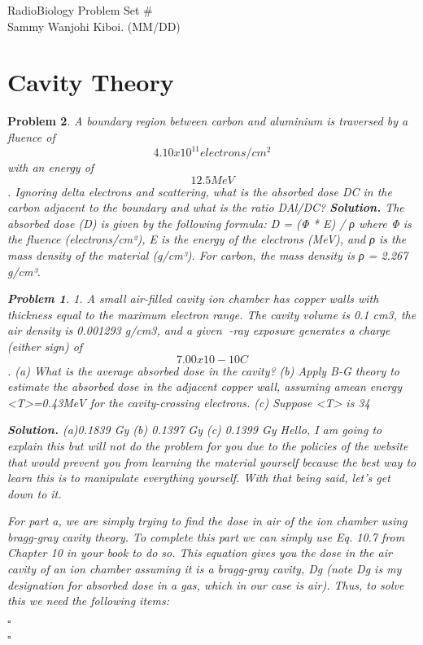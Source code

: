\documentclass[12pt]{article}
\newtheorem{problem}{Problem}
\newenvironment{solution}[1][\it{Solution}]{\textbf{#1. } }{$\square$}
\begin{document}
\noindent RadioBiology \hfill Problem Set \#\\
Sammy Wanjohi Kiboi. (MM/DD)

\hrulefill

\section{Cavity Theory}
\begin{problem}
A boundary region between carbon and aluminium is traversed by a fluence of \begin{equation}4.10x10^11 electrons/cm^2 \end{equation} with an energy of \begin{equation}12.5 MeV\end{equation}. Ignoring delta electrons and scattering, what is the absorbed dose DC in the carbon adjacent to the boundary and what is the ratio DAl/DC?
\begin{solution}
The absorbed dose (D) is given by the following formula: D = (Φ * E) / ρ where Φ is the fluence (electrons/cm²), E is the energy of the electrons (MeV), and ρ is the mass density of the material (g/cm³). For carbon, the mass density is ρ = 2.267 g/cm³.

\newline
\begin{problem}
1. A small air-filled cavity ion chamber has copper walls with thickness equal to the maximum electron range. The cavity volume is 0.1 cm3, the air density is 0.001293 g/cm3, and a given -ray exposure generates a charge (either sign) of \begin{equation}7.00x10-10 C\end{equation}.
(a) What is the average absorbed dose in the cavity?
(b) Apply B-G theory to estimate the absorbed dose in the adjacent copper wall, assuming amean energy <T>=0.43MeV for the cavity-crossing electrons.
(c) Suppose <T> is 34%

\begin{solution}
(a)0.1839 Gy
(b) 0.1397 Gy
(c) 0.1399 Gy
Hello, I am going to explain this but will not do the problem for you due to the policies of the website that would prevent you from learning the material yourself because the best way to learn this is to manipulate everything yourself. With that being said, let's get down to it.

For part a, we are simply trying to find the dose in air of the ion chamber using bragg-gray cavity theory. To complete this part we can simply use Eq. 10.7 from Chapter 10 in your book to do so. This equation gives you the dose in the air cavity of an ion chamber assuming it is a bragg-gray cavity, Dg (note Dg is my designation for absorbed dose in a gas, which in our case is air). Thus, to solve this we need the following items:


\end{solution}
\end{problem}
\end{solution}
\end{problem}
\end{document}
